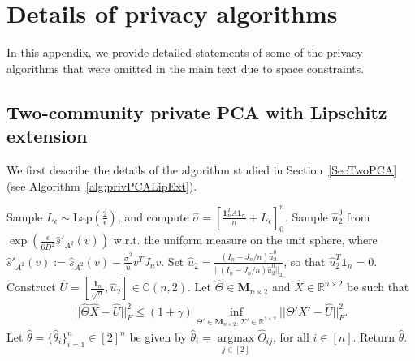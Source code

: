 \documentclass{article}
\newcommand{\sigmahat}{\ensuremath{\widehat{\sigma}}}
\begin{document}

\section{Details of privacy algorithms}
\label{AppPrivate}

In this appendix, we provide detailed statements of some of the privacy algorithms that were omitted in the main text due to space constraints.


\subsection{Two-community private PCA with Lipschitz extension} 
\label{AppPCALip}

We first describe the details of the algorithm studied in Section~\ref{SecTwoPCA} (see Algorithm~\ref{alg:privPCALipExt}).

\begin{algorithm}[h!]
\caption{Private PCA via Lipschitz Extension}
\label{alg:privPCALipExt}
\begin{algorithmic}[1]
    \State Sample $L_\epsilon \sim \mathrm{Lap}\left(\frac{2}{\epsilon}\right)$, and compute $\sigmahat = \left[\frac{\textbf{1}_n^T A\textbf{1}_n}{n} + L_\epsilon\right]_{0}^n$.
    \State Sample $\hat{u}^{0}_2$ from $\exp\left(\frac{\epsilon}{6D^2}\widehat{s}'_{A^2}(v)\right)$ w.r.t. the uniform measure on the unit sphere, where $\widehat{s}'_{A^2}(v) := \widehat{s}_{A^2}(v) - \frac{\sigmahat^2}{n} v^T J_nv$.
    \State Set $\hat{u}_2 = \frac{(I_n - J_n/n)\hat{u}^{0}_2}{||(I_n - J_n/n)\hat{u}^{0}_2||_2}$, so that $\hat{u}_2^T\mathbf{1}_n = 0$.
    \State Construct $\hat{U} = \left[\frac{\mathbf{1}_n}{\sqrt{n}}, \hat{u}_2\right] \in \mathbb{O}(n, 2)$.
    \State Let $\hat{\Theta} \in \mathbf{M}_{n\times 2}$ and $\hat{X} \in \mathbb{R}^{n \times 2}$ be such that 
    \begin{align*}
        ||\hat{\Theta}\hat{X} - \hat{U}||_F^2 \leq (1 + \gamma)\mathop{\inf}\limits_{\Theta' \in \mathbf{M}_{n\times 2}, X' \in \mathbb{R}^{2 \times 2}}||\Theta'X' - \hat{U}||_F^2.
    \end{align*}
    \State Let $\hat{\theta} = \{\hat{\theta}_i\}_{i = 1}^n \in [2]^n$ be given by $\hat{\theta}_i = \mathop{\arg\max}\limits_{j \in [2]}\hat{\Theta}_{ij}$, for all $i \in [n]$.
    \State Return $\hat{\theta}$.
\EndFunction
\end{algorithmic}
\end{algorithm}
\end{document}
